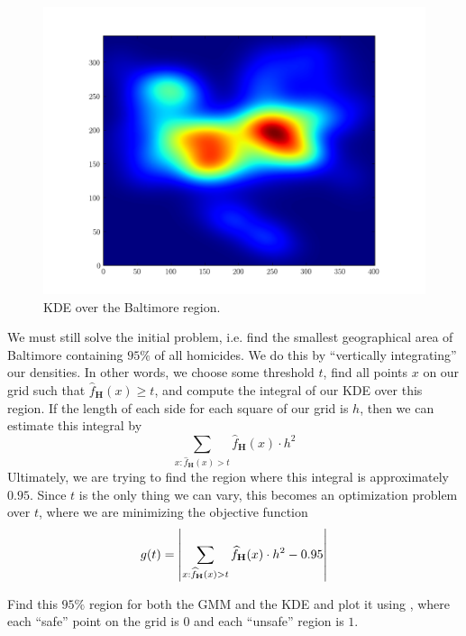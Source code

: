 \begin{figure}[h]
\centering
\includegraphics[width=\textwidth]{baltimore_kde.pdf}
\caption{KDE over the Baltimore region.}
\label{fig:baltimorekde}
\end{figure}

We must still solve the initial problem, i.e. find the smallest geographical area of Baltimore containing $95\%$ of all homicides. We do this by ``vertically integrating'' our densities. In other words, we choose some threshold $t$, find all points $x$ on our grid such that $\widehat{f}_{\mathbf{H}}(x) \geq t$, and compute the integral of our KDE over this region. If the length of each side for each square of our grid is $h$, then we can estimate this integral by
\begin{equation*}
\sum_{x : \widehat{f}_{\mathbf{H}}(x) > t} \widehat{f}_{\mathbf{H}}(x)\cdot h^{2}
\end{equation*}
Ultimately, we are trying to find the region where this integral is approximately $0.95$. Since $t$ is the only thing we can vary, this becomes an optimization problem over $t$, where we are minimizing the objective function
\begin{equation*}
g(t) = \left\lvert\sum_{x : \widehat{f}_{\mathbf{H}}(x) > t} \widehat{f}_{\mathbf{H}}(x)\cdot h^{2} - 0.95\right\rvert
\end{equation*}

\begin{problem}
Find this $95\%$ region for both the GMM and the KDE and plot it using , where each ``safe'' point on the grid is $0$ and each ``unsafe'' region is $1$.
\end{problem}
